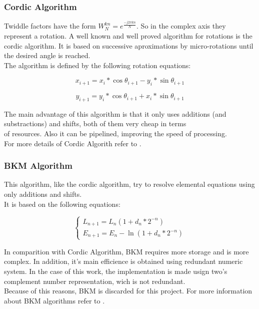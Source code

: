 \documentclass[conference]{IEEEtran}
\begin{document}
\subsubsection{Cordic Algorithm}

Twiddle factors have the form $W_N^{kn}=e^{\frac{-j2\pi kn}{N}}$. So in the complex axis they represent a rotation. A well known and well proved 
algorithm for rotations is the cordic algorithm. It is based on successive aproximations by micro-rotations until the desired angle is reached.\\
The algorithm is defined by the following rotation equations:

\begin{equation}
x_{i+1} = x_i* \cos \theta_{i+1} - y_i* \sin \theta_{i+1}
\label{eq:micrototX}
\end{equation}

\begin{equation}
y_{i+1} = y_i* \cos \theta_{i+1} + x_i* \sin \theta_{i+1}
\label{eq:micrototY}
\end{equation}

The main advantage of this algorithm is that it only uses additions (and substractions) and shifts, both of them very cheap in terms \\
of resources. Also it can be pipelined, improving the speed of processing.\\

For more details of Cordic Algorith refer to \cite{Volder}.

\subsubsection{BKM Algorithm}

This algorithm, like the cordic algorithm, try to resolve elemental equations using only additions and shifts.\\
It is based on the following equations:

\begin{equation}
	\begin{cases}
	L_{n+1} = L_n(1+d_n*2^{-n}) \\
	E_{n+1} = E_n - \ln (1+d_n*2^{-n})
	\end{cases}
\label{eq:BKM}
\end{equation}

In comparition with Cordic Algorithm, BKM requires more storage and is more complex. In addition, it's main efficience is obtained using 
redundant numeric system. In the case of this work, the implementation is made usign two's complement number representation, wich is not redundant.\\
Because of this reasons, BKM is discarded for this project. For more information about BKM algorithms refer to \cite{BKM}.
\end{document}
